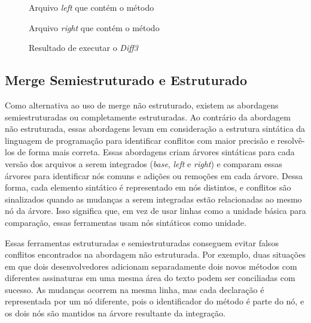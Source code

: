 \begin{figure}[ht]
	\begin{center}
		
		\caption{Arquivo \emph{left} que contém o método }\label{left_example}
	\end{center}
\end{figure}

\begin{figure}[ht]
	\begin{center}
		
		\caption{Arquivo \emph{right} que contém o método }\label{right_example}
	\end{center}
\end{figure}

\begin{figure}[ht]
	\begin{center}
		
	\end{center}
	\caption{Resultado de executar o \emph{Diff3}}\label{diff3_example}
\end{figure}

\subsection{Merge Semiestruturado e Estruturado}
Como alternativa ao uso de merge não estruturado, existem as abordagens
semiestruturadas ou completamente estruturadas. Ao contrário da abordagem não
estruturada, essas abordagens levam em consideração a estrutura sintática da
linguagem de programação para identificar conflitos com maior precisão e resolvê-los de
forma mais correta. Essas abordagens criam árvores sintáticas para
cada versão dos arquivos a serem integrados (\emph{base}, \emph{left} e \emph{right})
e comparam essas árvores para identificar nós comuns
e adições ou remoções em cada árvore. Dessa forma, cada elemento sintático
é representado em nós distintos, e conflitos são sinalizados quando as mudanças
a serem integradas estão relacionadas ao mesmo nó da árvore. Isso significa
que, em vez de usar linhas como a unidade básica para comparação, essas ferramentas usam
nós sintáticos como unidade.

Essas ferramentas estruturadas e semiestruturadas conseguem evitar falsos conflitos
encontrados na abordagem não estruturada. Por exemplo, duas situações em
que dois desenvolvedores adicionam separadamente dois novos métodos com diferentes
assinaturas em uma mesma área do texto podem ser conciliadas com sucesso.
As mudanças ocorrem na mesma linha, mas cada declaração é representada por
um nó diferente, pois o identificador do método é parte do nó,
e os dois nós são mantidos na árvore resultante da integração.

